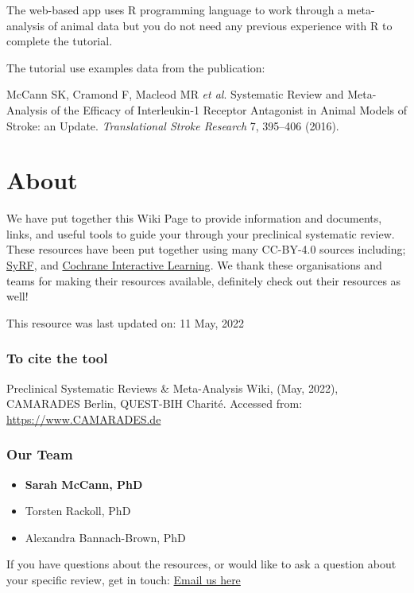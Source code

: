\documentclass[
]{book}
\providecommand{\tightlist}{%
  \setlength{\itemsep}{0pt}\setlength{\parskip}{0pt}}
\begin{document}
The web-based app uses R programming language to work through a meta-analysis of animal data but you do not need any previous experience with R to complete the tutorial.

The tutorial use examples data from the publication:

McCann SK, Cramond F, Macleod MR \emph{et al}. Systematic Review and
Meta-Analysis of the Efficacy of Interleukin-1 Receptor Antagonist in
Animal Models of Stroke: an Update. \emph{Translational Stroke Research} 7, 395--406 (2016).

\hypertarget{about}{%
\chapter{About}\label{about}}

We have put together this Wiki Page to provide information and documents, links, and useful tools to guide your through your preclinical systematic review. These resources have been put together using many CC-BY-4.0 sources including; \href{https://syrf.org.uk/}{SyRF}, and \href{https://training.cochrane.org/interactivelearning}{Cochrane Interactive Learning}. We thank these organisations and teams for making their resources available, definitely check out their resources as well!

This resource was last updated on: 11 May, 2022

\hypertarget{to-cite-the-tool}{%
\subsection{To cite the tool}\label{to-cite-the-tool}}

Preclinical Systematic Reviews \& Meta-Analysis Wiki, (May, 2022), CAMARADES Berlin, QUEST-BIH Charité. Accessed from: \url{https://www.CAMARADES.de}

\hypertarget{our-team}{%
\subsection{Our Team}\label{our-team}}

\begin{itemize}
\tightlist
\item
  \textbf{Sarah McCann, PhD}
\item
  Torsten Rackoll, PhD
\item
  Alexandra Bannach-Brown, PhD
\end{itemize}

If you have questions about the resources, or would like to ask a question about your specific review, get in touch: \href{mailto:CAMARADES.berlin@charite.de}{Email us here}
\end{document}
